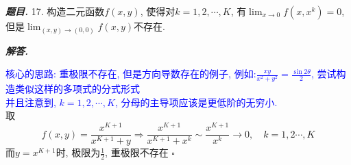 \documentclass[10pt, a4paper, oneside]{ctexart}
\newenvironment{problem}{\begin{framed}\par\noindent\textbf{\textit{题目. }}}{\end{framed}\par}
\newenvironment{solution}{%
  \par\noindent\textbf{\textit{解答. }}\ignorespaces
}{%
  \hfill\ensuremath{\square}\par %
}
\begin{document}
\begin{problem}
    17. 构造二元函数$f(x,y)$, 使得对$k=1,2,\cdots,K$, 有$\lim_{x\to 0}f(x,x^k)=0$, 但是$\lim_{(x,y)\to(0,0)}f(x,y)$不存在.
\end{problem}
\begin{solution}
\textcolor{blue}{核心的思路: 重极限不存在, 但是方向导数存在的例子, 例如:$\frac{xy}{x^2+y^2} = \frac{\sin 2\theta}{2}$, 尝试构造类似这样的多项式的分式形式\\
并且注意到, $k=1,2,\cdots,K$, 分母的主导项应该是更低阶的无穷小.}\\
取
$$f(x,y)=\frac{x^{K+1}}{x^{K+1}+y} \Rightarrow \frac{x^{K+1}}{x^{K+1}+x^k} \sim \frac{x^{K+1}}{x^k} \to 0, \quad k=1,2\cdots,K$$
而$y=x^{K+1}$时, 极限为$\frac{1}{2}$, 重极限不存在
\end{solution}
\end{document}
